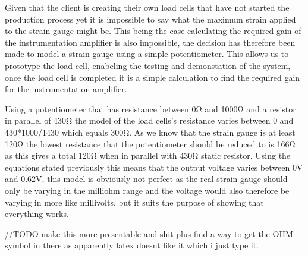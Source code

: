Given that the client is creating their own load cells that have not started the production process yet it is impossible to say what the maximum strain applied to the strain gauge might be. This being the case calculating the required gain of the instrumentation amplifier is also impossible, the decision has therefore been made to model a strain gauge using a simple potentiometer. This allows us to prototype the load cell, enabeling the testing and demonstation of the system, once the load cell is completed it is a simple calculation to find the required gain for the instrumentation amplifier. 

Using a potentiometer that has resistance between 0Ω and 1000Ω and a resistor in parallel of 430Ω the model of the load cells's resistance varies between 0 and 430*1000/1430 which equals 300Ω. As we know that the strain gauge is at least 120Ω the lowest resistance that the potentiometer should be reduced to is 166Ω as this gives a total 120Ω when in parallel with 430Ω static resistor. Using the equations stated previously this means that the output voltage varies between 0V and 0.62V, this model is obviously not perfect as the real strain gauge should only be varying in the milliohm range and the voltage would also therefore be varying in more like millivolts, but it suits the purpose of showing that everything works. 


//TODO make this more presentable and shit plus find a way to get the OHM symbol in there as apparently latex doesnt like it which i just type it.